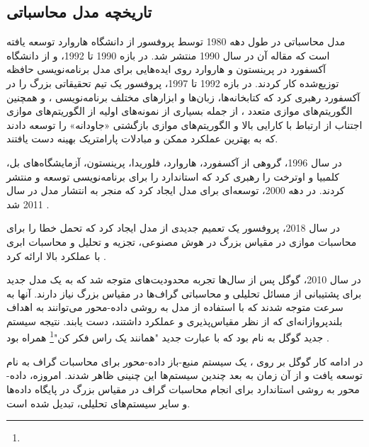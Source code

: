 \subsection{تاریخچه مدل محاسباتی }
مدل محاسباتی  در طول دهه 1980 توسط پروفسور  از دانشگاه هاروارد  توسعه یافته است که مقاله آن در سال 1990  منتشر شد. در بازه 1990 تا 1992،  و  از دانشگاه آکسفورد در پرینستون و هاروارد روی ایده‌هایی برای مدل برنامه‌نویسی  حافظه توزیع‌شده کار کردند. در بازه 1992 تا 1997، پروفسور  یک تیم تحقیقاتی بزرگ را در آکسفورد رهبری کرد که کتابخانه‌ها، زبان‌ها و ابزارهای مختلف برنامه‌نویسی ، و همچنین الگوریتم‌های موازی متعدد ، از جمله بسیاری از نمونه‌های اولیه از الگوریتم‌های موازی اجتناب از ارتباط با کارایی بالا و الگوریتم‌های موازی بازگشتی «جاودانه» را توسعه دادند که به بهترین عملکرد ممکن و مبادلات پارامتریک بهینه دست یافتند.

در سال 1996،  گروهی از آکسفورد، هاروارد، فلوریدا، پرینستون، آزمایشگاه‌های بل، کلمبیا و اوترخت را رهبری کرد که استاندارد  را برای برنامه‌نویسی  توسعه و منتشر کردند. در دهه 2000،  توسعه‌ای برای مدل  ایجاد کرد که منجر به انتشار مدل  در سال 2011 شد \cite{MultiBSP}. 

در سال 2018، پروفسور  یک تعمیم جدیدی از مدل  ایجاد کرد که تحمل خطا را برای محاسبات موازی در مقیاس بزرگ در هوش مصنوعی، تجزیه و تحلیل و محاسبات ابری با عملکرد بالا ارائه کرد \cite{BridgingMcColl}.

در سال 2010، گوگل پس از سال‌ها تجربه محدودیت‌های  متوجه شد که به یک مدل جدید برای پشتیبانی از مسائل تحلیلی و محاسباتی گراف‌ها در مقیاس بزرگ نیاز دارند. آنها به سرعت متوجه شدند که با استفاده از مدل  به روشی داده-محور می‌توانند به اهداف بلندپروازانه‌ای که از نظر مقیاس‌پذیری و عملکرد داشتند، دست یابند. نتیجه سیستم جدید گوگل به نام  \cite{Pregle2010} بود که با عبارت جدید "همانند یک راس فکر کن"\footnote{} همراه بود \cite{McColl2021}.

در ادامه کار گوگل بر روی ، یک سیستم  منبع-باز داده-محور برای محاسبات گراف به نام  توسعه یافت و از آن زمان به بعد چندین سیستم‌ها این چنینی ظاهر شدند. امروزه،  داده-محور به روشی استاندارد برای انجام محاسبات گراف در مقیاس بزرگ در پایگاه داده‌ها و سایر سیستم‌های تحلیلی، تبدیل شده است.

